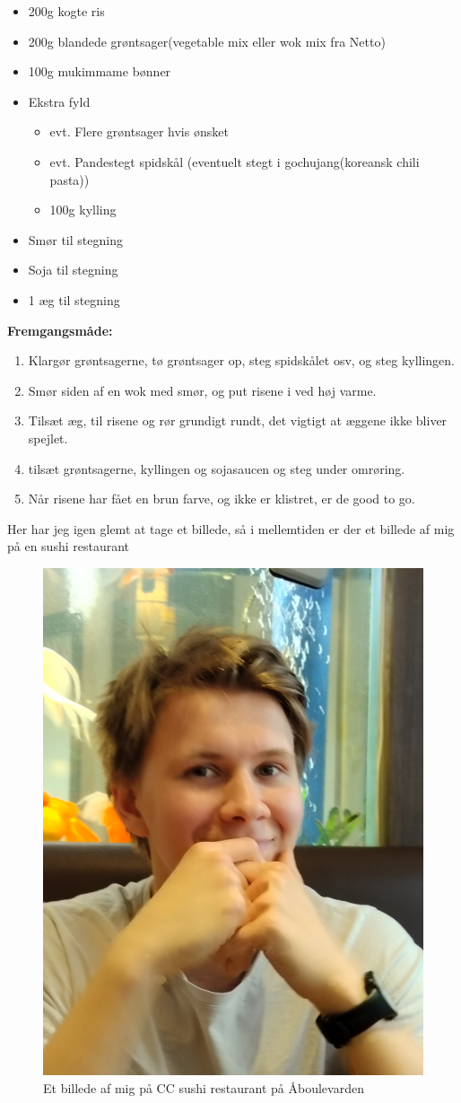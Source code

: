 \documentclass{book}
\begin{document}
\begin{minipage}[t]{0.5\textwidth}
\begin{itemize}
    \item 200g kogte ris
    \item 200g blandede grøntsager(vegetable mix eller wok mix fra Netto)
    \item 100g mukimmame bønner
    \item Ekstra fyld
     \begin{itemize}
        \item evt. Flere grøntsager hvis ønsket
        \item evt. Pandestegt spidskål (eventuelt stegt i gochujang(koreansk chili pasta))
        \item 100g kylling
    \end{itemize}
    \item Smør til stegning
    \item Soja til stegning
    \item 1 æg til stegning
\end{itemize}
\end{minipage}
\begin{minipage}[t]{0.5\textwidth}
\textbf{Fremgangsmåde:}
\begin{enumerate}
    \item Klargør grøntsagerne, tø grøntsager op, steg spidskålet osv, og steg kyllingen.
    \item Smør siden af en wok med smør, og put risene i ved høj varme.
    \item Tilsæt æg, til risene og rør grundigt rundt, det vigtigt at æggene ikke bliver spejlet.
    \item tilsæt grøntsagerne, kyllingen og sojasaucen og steg under omrøring.
    \item Når risene har fået en brun farve, og ikke er klistret, er de good to go.
\end{enumerate}
\end{minipage}
\newpage   Her har jeg igen glemt at tage et billede, så i mellemtiden er der et billede af mig på en sushi restaurant  \begin{figure}
    \centering
    \includegraphics[width=0.5\linewidth]{Sushi_spisning.jpg}
    \caption{Et billede af mig på CC sushi restaurant  på Åboulevarden}
\end{figure}
\end{document}
